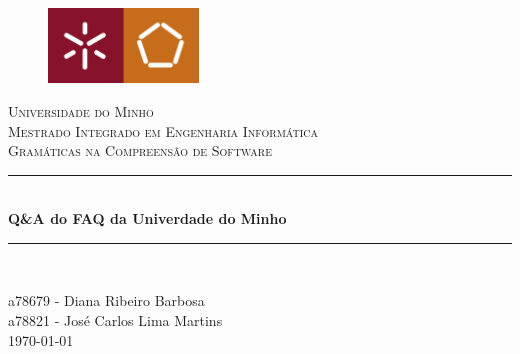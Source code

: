 \begin{titlepage}
    \center
    \begin{figure}[H]
        \centering
        \includegraphics[width=4cm]{imagens/UM_EENG.jpg}
    \end{figure}
    \textsc{\LARGE Universidade do Minho} \\ [1.5cm]
    \textsc{\Large Mestrado Integrado em Engenharia Informática} \\ [0.5cm]
    \textsc{\large Gramáticas na Compreensão de Software} \\ [0.5cm]
    
    \vspace*{1cm}
    
    \rule{\linewidth}{0.5mm} \\ [0.25cm]
    {\huge \bfseries Q\&A do FAQ da Univerdade do Minho}
    \rule{\linewidth}{0.5mm} \\ [0.25cm]
    
    \vspace*{1cm}

    a78679 - Diana Ribeiro Barbosa \\
    a78821 - José Carlos Lima Martins \\[0.25cm]

    \today
\end{titlepage}
